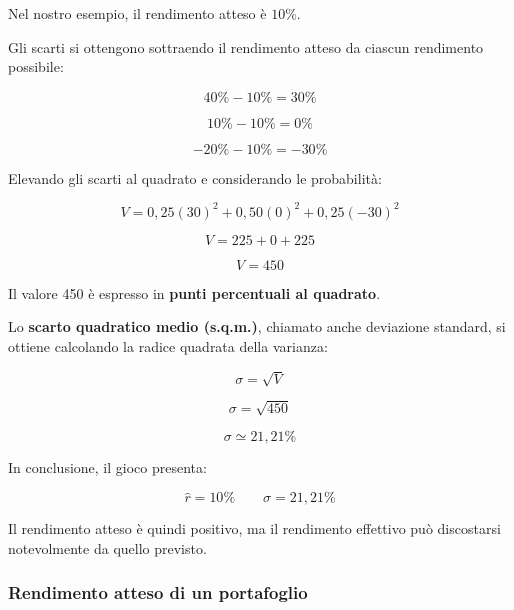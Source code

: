 \noindent Nel nostro esempio, il rendimento atteso è $10\%$.

\begin{center}
\end{center}

\noindent Gli scarti si ottengono sottraendo
il rendimento atteso da ciascun rendimento possibile:

\[
40\%-10\%=30\%
\]

\[
10\%-10\%=0\%
\]

\[
-20\%-10\%=-30\%
\]

\noindent Elevando gli scarti al quadrato
e considerando le probabilità:

\[
V=0{,}25(30)^2+0{,}50(0)^2+0{,}25(-30)^2
\]

\[
V=225+0+225
\]

\[
\boxed{V=450}
\]

\noindent Il valore 450 è espresso in
\textbf{punti percentuali al quadrato}.

\medskip

\noindent Lo \textbf{scarto quadratico medio (s.q.m.)},
chiamato anche deviazione standard,
si ottiene calcolando la radice quadrata della varianza:

\[
\boxed{\sigma=\sqrt{V}}
\]

\[
\sigma=\sqrt{450}
\]

\[
\boxed{\sigma\simeq21{,}21\%}
\]

\noindent In conclusione, il gioco presenta:

\[
\boxed{
\hat{r}=10\%
\qquad
\sigma=21{,}21\%
}
\]

\noindent Il rendimento atteso è quindi positivo,
ma il rendimento effettivo può discostarsi
notevolmente da quello previsto.


\subsubsection*{Rendimento atteso di un portafoglio}

